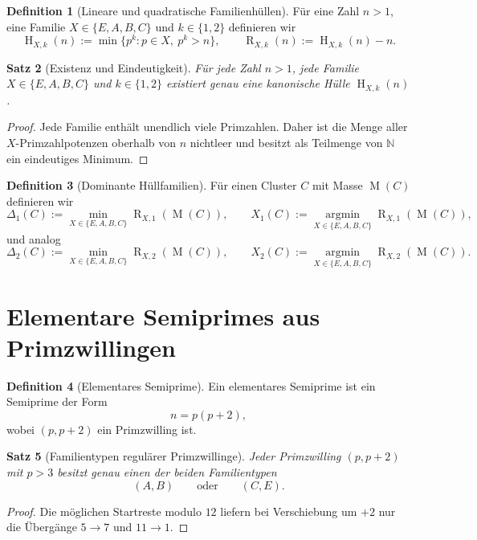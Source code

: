\documentclass[12pt,a4paper]{article}
\newtheorem{satz}{Satz}[section]
\theoremstyle{definition}
\newtheorem{definition}[satz]{Definition}
\theoremstyle{remark}
\newcommand{\N}{\mathbb{N}}
\newcommand{\Masse}{\operatorname{M}}
\newcommand{\Huelle}{\operatorname{H}}
\newcommand{\Rest}{\operatorname{R}}
\newcommand{\argmin}{\operatorname*{argmin}}
\begin{document}
	\begin{definition}[Lineare und quadratische Familienhüllen]
		Für eine Zahl \(n>1\), eine Familie \(X\in\{E,A,B,C\}\) und \(k\in\{1,2\}\) definieren wir
		\[
		\Huelle_{X,k}(n):=\min\{p^k:p\in X,\ p^k>n\},
		\qquad
		\Rest_{X,k}(n):=\Huelle_{X,k}(n)-n.
		\]
	\end{definition}
	
	\begin{satz}[Existenz und Eindeutigkeit]
		Für jede Zahl \(n>1\), jede Familie \(X\in\{E,A,B,C\}\) und \(k\in\{1,2\}\) existiert genau eine kanonische Hülle \(\Huelle_{X,k}(n)\).
	\end{satz}
	
	\begin{proof}
		Jede Familie enthält unendlich viele Primzahlen. Daher ist die Menge aller \(X\)-Primzahlpotenzen oberhalb von \(n\) nichtleer und besitzt als Teilmenge von \(\N\) ein eindeutiges Minimum.
	\end{proof}
	
	\begin{definition}[Dominante Hüllfamilien]
		Für einen Cluster \(C\) mit Masse \(\Masse(C)\) definieren wir
		\[
		\Delta_1(C):=\min_{X\in\{E,A,B,C\}}\Rest_{X,1}(\Masse(C)),
		\qquad
		X_1(C):=\argmin_{X\in\{E,A,B,C\}}\Rest_{X,1}(\Masse(C)),
		\]
		und analog
		\[
		\Delta_2(C):=\min_{X\in\{E,A,B,C\}}\Rest_{X,2}(\Masse(C)),
		\qquad
		X_2(C):=\argmin_{X\in\{E,A,B,C\}}\Rest_{X,2}(\Masse(C)).
		\]
	\end{definition}
	
	\section{Elementare Semiprimes aus Primzwillingen}
	
	\begin{definition}[Elementares Semiprime]
		Ein elementares Semiprime ist ein Semiprime der Form
		\[
		n=p(p+2),
		\]
		wobei \((p,p+2)\) ein Primzwilling ist.
	\end{definition}
	
	\begin{satz}[Familientypen regulärer Primzwillinge]
		Jeder Primzwilling \((p,p+2)\) mit \(p>3\) besitzt genau einen der beiden Familientypen
		\[
		(A,B)\qquad\text{oder}\qquad(C,E).
		\]
	\end{satz}
	
	\begin{proof}
		Die möglichen Startreste modulo \(12\) liefern bei Verschiebung um \(+2\) nur die Übergänge \(5\to7\) und \(11\to1\).
	\end{proof}
	
\end{document}
